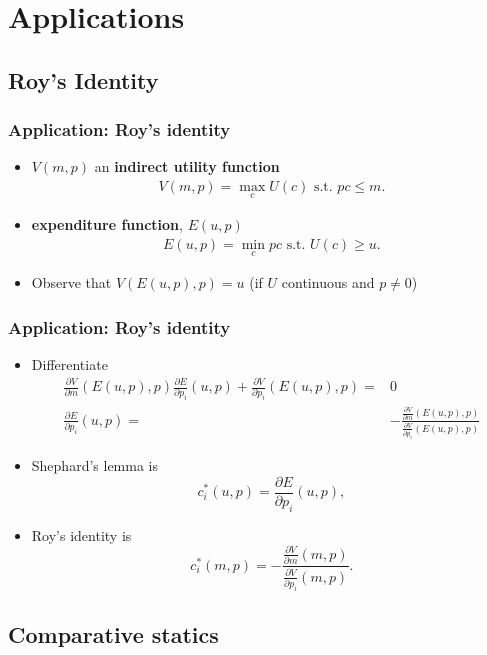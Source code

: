 \documentclass[compress]{beamer}
\begin{document}
\section{Applications}
\subsection{Roy's Identity}

\begin{frame}
  \frametitle{Application: Roy's identity}
  \begin{itemize}
  \item $V(m,p)$ an \textbf{indirect utility function} 
    \begin{align}
      V(m,p) = \max_c U(c) \text{ s.t. } pc \leq m. \label{eq:iu}
    \end{align}
  \item \textbf{expenditure function}, $E(u,p)$
    \begin{align}
      E(u,p) = \min_c pc \text{ s.t. } U(c) \geq u. \label{eq:ex}
    \end{align}
  \item Observe that $V(E(u,p),p) = u$ (if $U$ continuous and $p \neq 0$)
  \end{itemize}
\end{frame}

\begin{frame}
  \frametitle{Application: Roy's identity}
  \begin{itemize}
  \item Differentiate
    \begin{align*}
      \frac{\partial V}{\partial m} (E(u,p),p) \frac{\partial E}{\partial
        p_i}(u,p) + \frac{\partial V}{\partial p_i} (E(u,p),p) = & 0 \\
      \frac{\partial E}{\partial
        p_i}(u,p) = & -\frac{\frac{\partial V}{\partial m} (E(u,p),p)}
      {\frac{\partial V}{\partial p_i} (E(u,p),p)} 
    \end{align*}
  \item Shephard's lemma is
    \[ c_i^*(u,p) =  \frac{\partial E}{\partial p_i}(u,p), \]
  \item Roy's identity is
    \[ c_i^*(m,p) = -\frac{\frac{\partial V}{\partial m} (m,p)}
    {\frac{\partial V}{\partial p_i} (m,p)}. \]
  \end{itemize}
\end{frame}


\subsection{Comparative statics}
\end{document}
